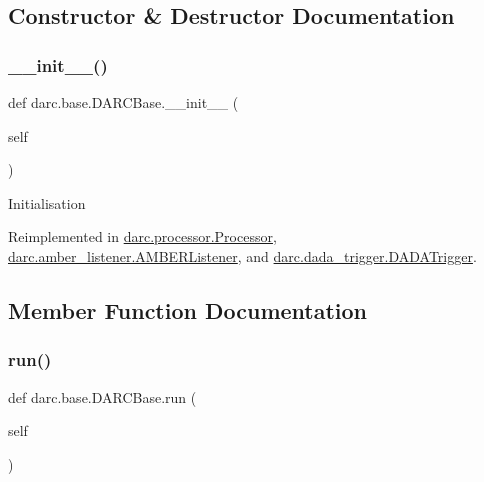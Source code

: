\subsection{Constructor \& Destructor Documentation}
\mbox{\label{classdarc_1_1base_1_1_d_a_r_c_base_ac14d433a0b0c403939d6a2f8271f56b4}} 
\subsubsection{\texorpdfstring{\_\_init\_\_()}{\_\_init\_\_()}}
{\footnotesize\ttfamily def darc.\+base.\+D\+A\+R\+C\+Base.\+\_\+\+\_\+init\+\_\+\+\_\+ (\begin{DoxyParamCaption}\item[{}]{self }\end{DoxyParamCaption})}

\begin{DoxyVerb}Initialisation
\end{DoxyVerb}
 

Reimplemented in \mbox{\hyperlink{classdarc_1_1processor_1_1_processor_a82610338505fd26f2489149ed62ca282}{darc.\+processor.\+Processor}}, \mbox{\hyperlink{classdarc_1_1amber__listener_1_1_a_m_b_e_r_listener_a00dc17e121f7cc52ec1f5b455d4d1ef1}{darc.\+amber\+\_\+listener.\+A\+M\+B\+E\+R\+Listener}}, and \mbox{\hyperlink{classdarc_1_1dada__trigger_1_1_d_a_d_a_trigger_a329b9ddcd2774fda7129cbf74c9f9d5a}{darc.\+dada\+\_\+trigger.\+D\+A\+D\+A\+Trigger}}.



\subsection{Member Function Documentation}
\mbox{\label{classdarc_1_1base_1_1_d_a_r_c_base_a98ecb06e6f965f6758ce7b084b8c583e}} 
\subsubsection{\texorpdfstring{run()}{run()}}
{\footnotesize\ttfamily def darc.\+base.\+D\+A\+R\+C\+Base.\+run (\begin{DoxyParamCaption}\item[{}]{self }\end{DoxyParamCaption})}


